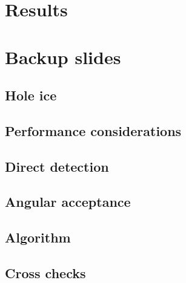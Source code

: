 \documentclass[green, 12pt]{beamer}
\begin{document}
\section{Results}
  

  

\appendix
\section{Backup slides}

\subsection{Hole ice}
  

\subsection{Performance considerations}
  
  
  

\subsection{Direct detection}
  

\subsection{Angular acceptance}
  
  

\subsection{Algorithm}
  

\subsection{Cross checks}
  
  
  
  
\end{document}
